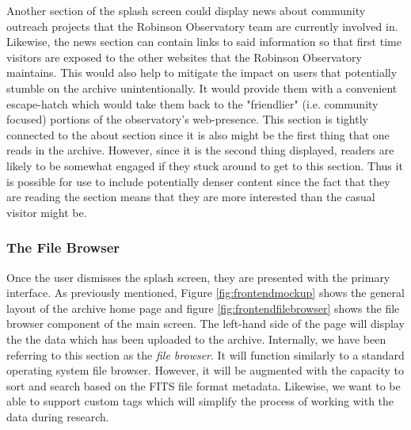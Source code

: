 \documentclass[12pt]{report}
\begin{document}
\begin{enumerate}
Another section of the splash screen could display news about community outreach projects that the Robinson Observatory team are currently involved in. Likewise, the news section can contain links to said information so that first time visitors are exposed to the other websites that the Robinson Observatory maintains. This would also help to mitigate the impact on users that potentially stumble on the archive unintentionally. It would provide them with a convenient escape-hatch which would take them back to the "friendlier" (i.e. community focused) portions of the observatory's web-presence. This section is tightly connected to the about section since it is also might be the first thing that one reads in the archive. However, since it is the second thing displayed, readers are likely to be somewhat engaged if they stuck around to get to this section. Thus it is possible for use to include potentially denser content since the fact that they are reading the section means that they are more interested than the casual visitor might be.

\subsubsection*{The File Browser}

Once the user dismisses the splash screen, they are presented with the primary interface. As previously mentioned, Figure \ref{fig:frontendmockup} shows the general layout of the archive home page and figure \ref{fig:frontendfilebrowser} shows the file browser component of the main screen. The left-hand side of the page will display the the data which has been uploaded to the archive. Internally, we have been referring to this section as the \textit{file browser}. It will function similarly to a standard operating system file browser. However, it will be augmented with the capacity to sort and search based on the FITS file format metadata. Likewise, we want to be able to support custom tags which will simplify the process of working with the data during research.


\end{enumerate}
\end{document}
